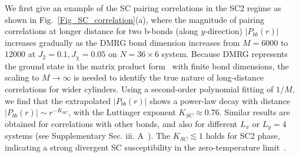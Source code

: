 \documentclass[aps,prx,reprint,superscriptaddress,showpacs]{revtex4-2}
\begin{document}
We first give an example of  the SC pairing correlations in the SC2 regime as shown in Fig.~\ref{Fig_SC_correlation}(a), where the magnitude of pairing correlations at longer distance for two b-bonds (along $y$-direction) $\left | P_{bb}(r) \right |$  increases gradually as the DMRG bond dimension increases from $M=6000$ to $12000$ at $J_{2}=0.1,J_{\chi}=0.05$ on $N=36\times 6$ system.
Because DMRG represents the ground state in the matrix product form~\cite{schollwock2011density} with finite bond dimensions, the scaling to $M\rightarrow \infty$ is needed to identify the true nature of long-distance correlations for wider cylinders. 
Using a second-order polynomial fitting of $1/M$, we find that the extrapolated $\left | P_{bb}(r) \right |$ shows a power-law decay with distance  $\left | P_{bb}(r) \right |\sim r^{-K_{SC}}$, with the Luttinger exponent $K_{SC}\approx 0.76$. Similar results are obtained for correlations with other bonds, and also for different $L_{x}$ or  $L_{y}=4$  systems (see Supplementary Sec. iii. A~\cite{SuppMaterial}). The  $K_{SC}\lesssim 1$ holds for SC2 phase, indicating a strong divergent SC susceptibility in the zero-temperature limit~\cite{jiang2021superconductivity}.
\end{document}
